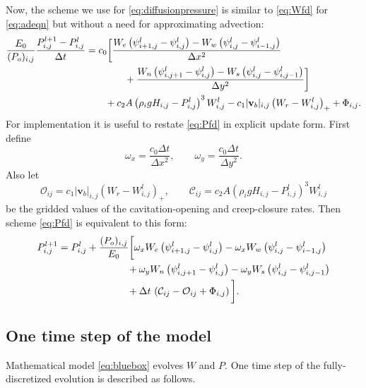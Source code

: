 \documentclass[11pt,final]{amsart}%
\newcommand\bv{\mathbf{v}}
\newcommand{\Wlij}{W^l_{i,j}}
\newcommand{\Plij}{P^l_{i,j}}
\begin{document}
Now, the scheme we use for \eqref{eq:diffusionpressure} is similar to \eqref{eq:Wfd} for \eqref{eq:adeqn} but without a need for approximating advection:
\begin{align}
\frac{E_0}{(P_o)_{i,j}} \frac{P_{i,j}^{l+1} - \Plij}{\Delta t} &= c_0 \bigg[\frac{W_e \left(\psi_{i+1,j}^l - \psi_{i,j}^l\right) - W_w \left(\psi_{i,j}^l - \psi_{i-1,j}^l\right)}{\Delta x^2}  \label{eq:Pfd} \\
      &\qquad\qquad + \frac{W_n \left(\psi_{i,j+1}^l - \psi_{i,j}^l\right) - W_s \left(\psi_{i,j}^l - \psi_{i,j-1}^l\right)}{\Delta y^2}\bigg] \notag \\
      &\qquad + c_2 A \left(\rho_i g H_{i,j}- \Plij\right)^3 \Wlij - c_1 |\bv_b|_{i,j} \left(W_r - \Wlij\right)_+ + \Phi_{i,j}. \notag
\end{align}
For implementation it is useful to restate \eqref{eq:Pfd} in explicit update form.  First define
	$$\omega_x = \frac{c_0 \Delta t}{\Delta x^2}, \qquad \omega_y = \frac{c_0 \Delta t}{\Delta y^2}.$$
Also let
	$$\mathcal{O}_{ij} = c_1 |\bv_b|_{i,j} \left(W_r - \Wlij\right)_+, \qquad \mathcal{C}_{ij} = c_2 A \left(\rho_i g H_{i,j} - \Plij\right)^3 \Wlij$$
be the gridded values of the cavitation-opening and creep-closure rates.  Then scheme \eqref{eq:Pfd} is equivalent to this form:
\begin{align}
P_{i,j}^{l+1} &= \Plij +  \frac{(P_o)_{i,j}}{E_0} \bigg[\omega_x W_e \left(\psi_{i+1,j}^l - \psi_{i,j}^l\right) - \omega_x W_w \left(\psi_{i,j}^l - \psi_{i-1,j}^l\right) \label{eq:Pfdupdate} \\
      &\qquad\qquad\qquad\quad + \omega_y W_n \left(\psi_{i,j+1}^l - \psi_{i,j}^l\right) - \omega_y W_s \left(\psi_{i,j}^l - \psi_{i,j-1}^l\right) \notag \\
      &\qquad\qquad\qquad\quad + \Delta t\, \left(\mathcal{C}_{ij} - \mathcal{O}_{ij} + \Phi_{i,j}\right)\bigg]. \notag
\end{align}

\subsection*{One time step of the model}  Mathematical model \eqref{eq:bluebox} evolves $W$ and $P$.  One time step of the fully-discretized evolution is described as follows.
\end{document}
